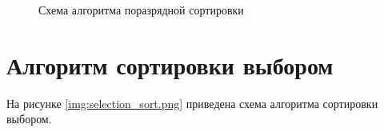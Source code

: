 

\begin{figure}[H!]
	
		
		\caption{Схема алгоритма поразрядной сортировки}
		
		\label{fig:radix_sort2}
		
	\end{figure}

\FloatBarrier
\section{Алгоритм сортировки выбором}
На рисунке \ref{img:selection_sort.png} приведена схема алгоритма сортировки выбором.
\\
\\
\\
\\
\\
\\
\\
\\
\\
\\
\\
\\
\\
\\
\\
\\
\\
\\
\\
\\
\\
\\
\\
\\
\\
\\
\\
\\

